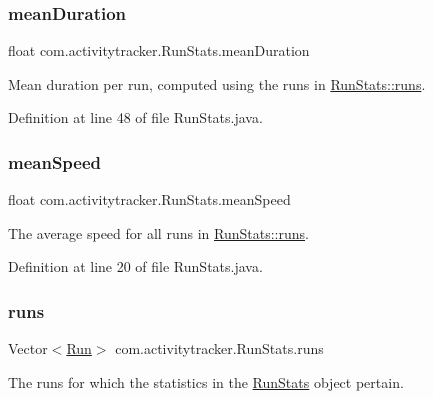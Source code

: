 \subsubsection{\texorpdfstring{meanDuration}{meanDuration}}
{\footnotesize\ttfamily float com.\+activitytracker.\+Run\+Stats.\+mean\+Duration\hspace{0.3cm}{\ttfamily [private]}}

Mean duration per run, computed using the runs in \mbox{\hyperlink{classcom_1_1activitytracker_1_1_run_stats_a0fd429e9f463ddf4897c507c0e3c0a12}{Run\+Stats\+::runs}}. 

Definition at line 48 of file Run\+Stats.\+java.

\mbox{\label{classcom_1_1activitytracker_1_1_run_stats_a64b9e6daf2be19571b8ad401922762c2}} 
\subsubsection{\texorpdfstring{meanSpeed}{meanSpeed}}
{\footnotesize\ttfamily float com.\+activitytracker.\+Run\+Stats.\+mean\+Speed\hspace{0.3cm}{\ttfamily [private]}}

The average speed for all runs in \mbox{\hyperlink{classcom_1_1activitytracker_1_1_run_stats_a0fd429e9f463ddf4897c507c0e3c0a12}{Run\+Stats\+::runs}}. 

Definition at line 20 of file Run\+Stats.\+java.

\mbox{\label{classcom_1_1activitytracker_1_1_run_stats_a0fd429e9f463ddf4897c507c0e3c0a12}} 
\subsubsection{\texorpdfstring{runs}{runs}}
{\footnotesize\ttfamily Vector$<$\mbox{\hyperlink{classcom_1_1activitytracker_1_1_run}{Run}}$>$ com.\+activitytracker.\+Run\+Stats.\+runs\hspace{0.3cm}{\ttfamily [private]}}

The runs for which the statistics in the \mbox{\hyperlink{classcom_1_1activitytracker_1_1_run_stats}{Run\+Stats}} object pertain. 

